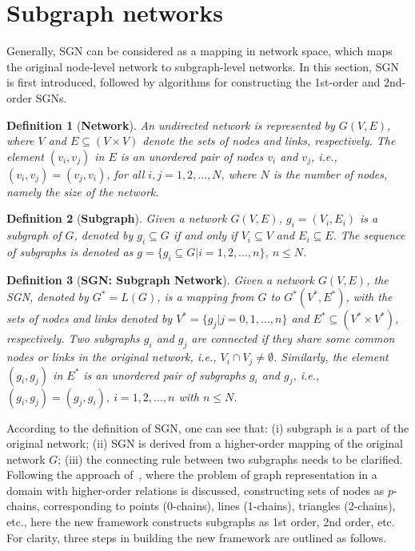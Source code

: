 \documentclass[10pt,journal,compsoc]{IEEEtran}
\begin{document}
\section{Subgraph networks}\label{sec:SGN}
Generally, SGN can be considered as a mapping in network space, which maps the original node-level network to subgraph-level networks.
In this section, SGN is first introduced, followed by algorithms for constructing the 1st-order and 2nd-order SGNs.

\newtheorem{myDef}{Definition}
\begin{myDef}[\textbf{Network}]\label{def:1}
An undirected network is represented by $G(V,E)$, where $V$ and $E\subseteq(V\times{V})$ denote the sets of nodes and links, respectively. The element $(v_i,v_j)$ in $E$ is an unordered pair of nodes $v_i$ and $v_j$, i.e., $(v_i,v_j)=(v_j,v_i)$, for all $i,j=1,2,...,N$, where $N$ is the number of nodes, namely the size of the network.
\end{myDef}

\begin{myDef}[\textbf{Subgraph}]\label{def:2}
Given a network $G(V,E)$, $g_i=(V_i,E_i)$ is a subgraph of $G$, denoted by $g_i\subseteq G$ if and only if $V_i\subseteq V$ and $E_i \subseteq E$. The sequence of subgraphs is denoted as $g = \{g_i\subseteq G|i=1,2,...,n\}$, $n\le N$.
\end{myDef}

\begin{myDef}[\textbf{SGN: Subgraph Network}]\label{def:3}
Given a network $G(V,E)$, the SGN, denoted by $G^*=L(G)$, is a mapping from $G$ to $G^*(V^*,E^*)$, with the sets of nodes and links denoted by $V^*=\{g_j|j = 0,1,...,n\}$ and $E^* \subseteq (V^* \times V^*)$, respectively. Two subgraphs $g_i$ and $g_j$ are connected if they share some common nodes or links in the original network, i.e., $V_i\cap{V_j}\neq\emptyset$. Similarly, the element $(g_i,g_j)$ in $E^*$ is an unordered pair of subgraphs $g_i$ and $g_j$, i.e., $(g_i,g_j)=(g_j,g_i)$, $i=1,2,...,n$ with $n\le N$.
\end{myDef}

According to the definition of SGN, one can see that: (i) subgraph is a part of the original network; (ii) SGN is derived from a higher-order mapping of the original network $G$; (iii) the connecting rule between two subgraphs needs to be clarified. Following the approach of~\cite{agarwal2006higher}, where the problem of graph representation in a domain with higher-order relations is discussed, constructing sets of nodes as $p$-chains, corresponding to points (0-chains), lines (1-chains), triangles (2-chains), etc., here the new framework constructs subgraphs as 1st order, 2nd order, etc. For clarity, three steps in building the new framework are outlined as follows.
\end{document}
